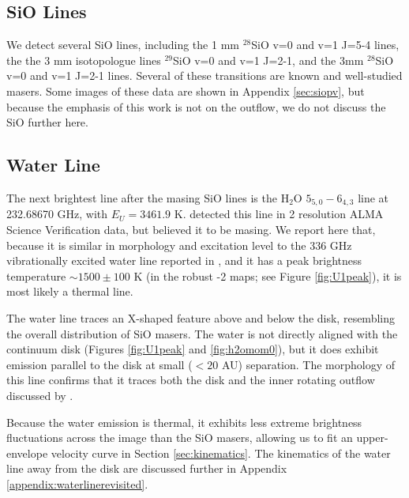 \documentclass[twocolumn]{aastex61}
\let\oldarcsec\arcsec
\renewcommand\arcsec{\oldarcsec\xspace}%
\newcommand{\water}{H$_{2}$O\xspace}		%
\begin{document}
\subsection{SiO Lines}
We detect several SiO lines, including the 1 mm $^{28}$SiO v=0 and v=1 J=5-4 lines,
the the 3 mm isotopologue lines $^{29}$SiO v=0 and v=1 J=2-1, and the 3mm
$^{28}$SiO v=0 and v=1 J=2-1 lines.  Several of these transitions are known and
well-studied masers.  Some images of these data are shown in
Appendix \ref{sec:siopv}, but because the emphasis of this work is not on the
outflow, we do not discuss the SiO further here.


\subsection{Water Line}
The next brightest line after the masing SiO lines is the \water
$5_{5,0}-6_{4,3}$ line at 232.68670 GHz, with $E_U=3461.9$ K.
\citet{Hirota2012a} detected this line in 2\arcsec resolution ALMA Science
Verification data, but believed it to be masing.  We report here that, because
it is similar in morphology and excitation level to the 336 GHz vibrationally
excited water line reported in \citet{Hirota2014a}, and it has a peak
brightness temperature $\sim1500\pm100$ K (in the robust -2 maps; see Figure
\ref{fig:U1peak}), it is most likely a thermal line.

The water line traces an X-shaped feature above and below the disk, resembling
the overall distribution of SiO masers.  The water is not directly aligned with
the continuum disk (Figures \ref{fig:U1peak} and \ref{fig:h2omom0}), but it
does exhibit emission parallel to the disk at small ($<20$ AU) separation.  
The morphology of this line confirms that it traces both the disk and
the inner rotating outflow discussed by \citet{Hirota2017b} \citep[see
also][]{Kim2008a,Matthews2010a}.


Because the water emission is thermal, it exhibits less extreme
brightness fluctuations across the image than the SiO masers, allowing us to
fit an upper-envelope velocity curve in Section \ref{sec:kinematics}.
The kinematics of the water line away from the disk are discussed
further in Appendix \ref{appendix:waterlinerevisited}.

\end{document}
